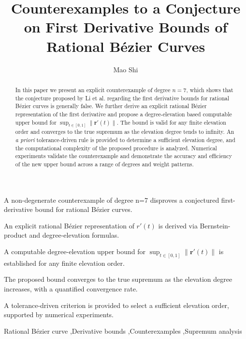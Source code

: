 \documentclass[preprint,12pt]{elsarticle}
\begin{document}
\begin{frontmatter}

\title{Counterexamples to a Conjecture on First Derivative Bounds of Rational Bézier Curves}

\author{Mao Shi}

\begin{abstract}
In this paper we present an explicit counterexample of degree $n=7$, which shows that the conjecture proposed by Li et al. \cite{Li2013} regarding the first derivative bounds for rational Bézier curves is generally false.
We further derive an explicit rational B\'ezier representation of the first derivative and propose a degree-elevation based computable upper bound for $\sup_{t\in[0,1]}\|\mathbf r'(t)\|$. 
The bound is valid for any finite elevation order and converges to the true supremum as the elevation degree tends to infinity.
An \emph{a priori} tolerance-driven rule is provided to determine a sufficient elevation degree, and the computational complexity of the proposed procedure is analyzed.
Numerical experiments validate the counterexample and demonstrate the accuracy and efficiency of the new upper bound across a range of degrees and weight patterns.

\end{abstract}

\begin{highlights}
\item A non-degenerate counterexample of degree n=7 disproves a conjectured first-derivative bound for rational Bézier curves.
\item An explicit rational Bézier representation of $r'(t)$ is derived via Bernstein-product and degree-elevation formulas.
\item A computable degree-elevation upper bound for $\sup_{t\in[0,1]}\|\mathbf r'(t)\|$ is established for any finite elevation order.
\item The proposed bound converges to the true supremum as the elevation degree increases, with a quantified convergence rate.
\item A tolerance-driven criterion is provided to select a sufficient elevation order, supported by numerical experiments.
\end{highlights}

\begin{keyword}
Rational Bézier curve \sep Derivative bounds \sep Counterexamples \sep Supremum analysis 
\end{keyword}

\end{frontmatter}
\end{document}
